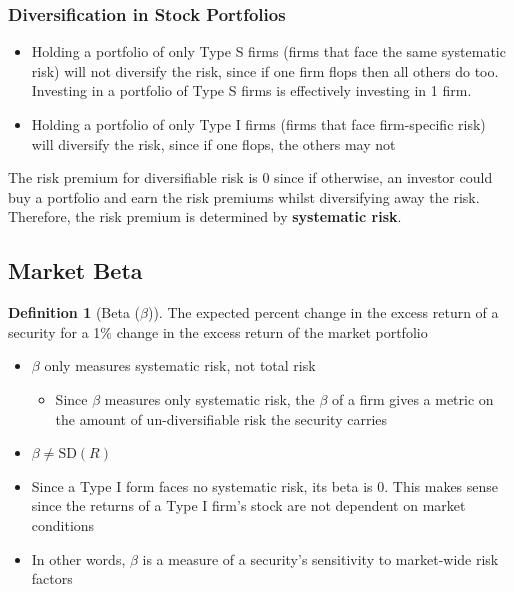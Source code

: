 \documentclass[11pt]{article}
\theoremstyle{definition}
\newtheorem*{definition}{Definition}
\newcommand{\Sd}{\text{SD}}
\begin{document}
\subsubsection{Diversification in Stock Portfolios}
\begin{itemize}
    \item Holding a portfolio of only Type S firms (firms that face the same systematic risk) will not diversify the risk, since if one firm flops then all others do too. Investing in a portfolio of Type S firms is effectively investing in 1 firm. 
    \item Holding a portfolio of only Type I firms (firms that face firm-specific risk) will diversify the risk, since if one flops, the others may not
\end{itemize}

The risk premium for diversifiable risk is 0 since if otherwise, an investor could buy a portfolio and earn the risk premiums whilst diversifying away the risk. Therefore, the risk premium is determined by \textbf{systematic risk}.

\subsection{Market Beta}
\begin{definition}[Beta ($\beta$)]
    The expected percent change in the excess return of a security for a 1$\%$ change in the excess return of the market portfolio
\end{definition}
\begin{itemize}
    \item $\beta$ only measures systematic risk, not total risk
    \begin{itemize}
        \item Since $\beta$ measures only systematic risk, the $\beta$ of a firm gives a metric on the amount of un-diversifiable risk the security carries
    \end{itemize}
    \item $\beta \neq \Sd(R)$
    \item Since a Type I form faces no systematic risk, its beta is $0$. This makes sense since the returns of a Type I firm's stock are not dependent on market conditions
    \item In other words, $\beta$ is a measure of a security's sensitivity to market-wide risk factors
\end{itemize}
\end{document}
